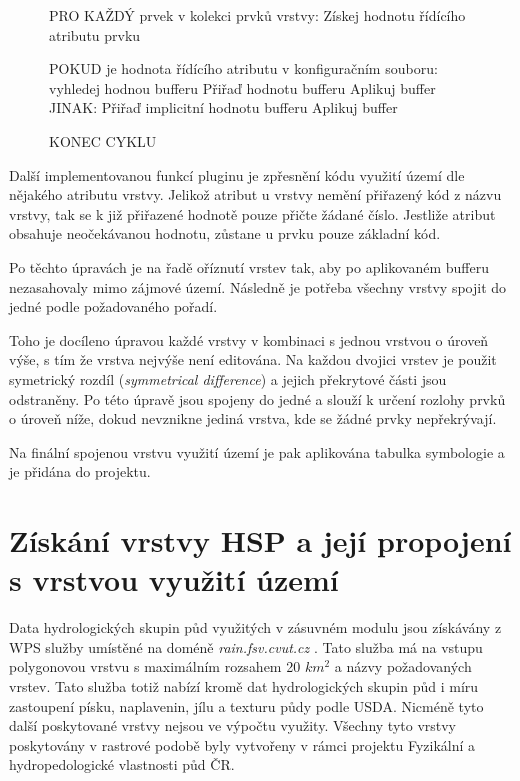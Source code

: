 \documentclass[a4paper,oneside,12pt]{book}
\begin{document}
\begin{figure}[H]
\begin{pseudocode}[style=mypseudocode, caption={Přiřazení velikosti bufferu}, label={kod:buffer}]
PRO KAŽDÝ prvek v kolekci prvků vrstvy:
    Získej hodnotu řídícího atributu prvku
 
    POKUD je hodnota řídícího atributu v konfiguračním souboru:
        vyhledej hodnou bufferu
        Přiřaď hodnotu bufferu
        Aplikuj buffer
    JINAK:
        Přiřaď implicitní hodnotu bufferu
        Aplikuj buffer
    
KONEC CYKLU
\end{pseudocode}
\end{figure}

\hspace{10mm}Další implementovanou funkcí pluginu je  zpřesnění kódu využití území dle nějakého atributu vrstvy. Jelikož atribut u vrstvy nemění přiřazený kód z názvu vrstvy, tak se k již přiřazené hodnotě pouze přičte žádané číslo. Jestliže atribut obsahuje neočekávanou hodnotu, zůstane u prvku pouze základní kód.

 \hspace{10mm}Po těchto úpravách je na řadě oříznutí vrstev tak, aby po aplikovaném bufferu nezasahovaly mimo zájmové území. Následně je potřeba všechny vrstvy spojit do jedné podle požadovaného pořadí. 
 
  \hspace{10mm} Toho je docíleno úpravou každé vrstvy v kombinaci s jednou vrstvou o úroveň výše, s tím že vrstva nejvýše není editována. Na každou dvojici vrstev je použit symetrický rozdíl (\textit{symmetrical difference}) a jejich překrytové části jsou odstraněny. Po této úpravě jsou spojeny do jedné a slouží k určení rozlohy prvků o úroveň níže, dokud nevznikne jediná vrstva, kde se žádné prvky nepřekrývají.
  
 Na finální spojenou vrstvu využití území je pak aplikována tabulka symbologie a je přidána do projektu.
 
\section{Získání vrstvy HSP a její propojení s vrstvou využití území} \label{intersection}
 \hspace{10mm}Data hydrologických skupin půd využitých v zásuvném modulu jsou získávány z WPS služby umístěné na doméně \textit{rain.fsv.cvut.cz} . Tato služba má na vstupu polygonovou vrstvu s maximálním rozsahem 20 $km^2$ a názvy požadovaných vrstev. Tato služba totiž nabízí kromě dat hydrologických skupin půd i míru zastoupení písku, naplavenin, jílu a texturu půdy podle USDA. Nicméně tyto další poskytované vrstvy nejsou ve výpočtu využity. Všechny tyto vrstvy poskytovány v rastrové podobě byly vytvořeny v rámci projektu Fyzikální a hydropedologické vlastnosti půd ČR.
\end{document}
